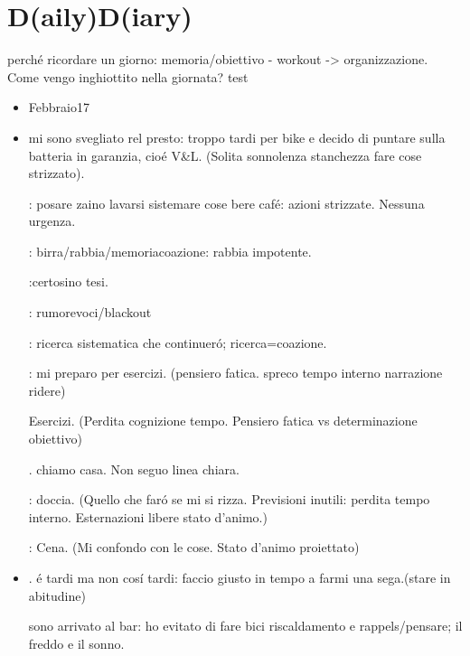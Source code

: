 \section{D(aily)D(iary)}

perch\'e ricordare un giorno: memoria/obiettivo - workout -> organizzazione.
Come vengo inghiottito nella giornata?
test
\listofkeywords

\begin{itemize}

\item Febbraio17

\item {}
mi sono svegliato rel presto: troppo tardi per bike e decido di puntare sulla batteria in garanzia, cio\'e V\&L. (Solita sonnolenza stanchezza fare cose strizzato).

: posare zaino lavarsi sistemare cose bere caf\'e: azioni strizzate. Nessuna urgenza.

: birra/rabbia/memoriacoazione: rabbia impotente.

:certosino tesi.

: rumorevoci/blackout

: ricerca sistematica che continuer\'o; ricerca=coazione.

: mi preparo per esercizi. (pensiero fatica. spreco tempo interno narrazione ridere)

 Esercizi. (Perdita cognizione tempo. Pensiero fatica vs determinazione obiettivo)

. chiamo casa. Non seguo linea chiara.

: doccia. (Quello che far\'o se mi si rizza. Previsioni inutili: perdita tempo interno. Esternazioni libere stato d'animo.)

: Cena. (Mi confondo con le cose. Stato d'animo proiettato)

\item {}.   \'e tardi ma non cos\'i tardi: faccio giusto in tempo a farmi una sega.(stare in abitudine)

 sono arrivato al bar: ho evitato di fare bici riscaldamento e rappels/pensare; il freddo e il sonno.


\end{itemize}

